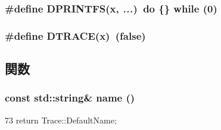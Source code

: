 \label{trace_8hh_ab50e5d70719a2562fe32d994959ad324}
\hypertarget{trace_8hh_af996ff4711b7ddc2a809a9a8ef54c24c}{
\subsubsection[{DPRINTFS}]{\setlength{\rightskip}{0pt plus 5cm}\#define DPRINTFS(x, \/   {\em ...})~do \{\} while (0)}}
\label{trace_8hh_af996ff4711b7ddc2a809a9a8ef54c24c}
\hypertarget{trace_8hh_af76c9f7776aade1bf9d7dfa8a0c6b341}{
\subsubsection[{DTRACE}]{\setlength{\rightskip}{0pt plus 5cm}\#define DTRACE(x)~(false)}}
\label{trace_8hh_af76c9f7776aade1bf9d7dfa8a0c6b341}


\subsection{関数}
\hypertarget{trace_8hh_a166fa10b86d8faa127fb7c78191e3e60}{
\subsubsection[{name}]{\setlength{\rightskip}{0pt plus 5cm}const std::string\& name ()}}
\label{trace_8hh_a166fa10b86d8faa127fb7c78191e3e60}



\begin{DoxyCode}
73 { return Trace::DefaultName; }
\end{DoxyCode}
